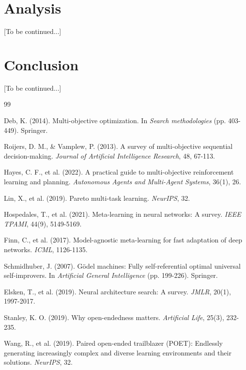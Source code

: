 \documentclass{article}
\begin{document}
\section{Analysis}
\label{sec:analysis}

[To be continued...]

\section{Conclusion}
\label{sec:conclusion}

[To be continued...]


\begin{thebibliography}{99}

Deb, K. (2014). Multi-objective optimization. In \textit{Search methodologies} (pp. 403-449). Springer.

Roijers, D. M., \& Vamplew, P. (2013). A survey of multi-objective sequential decision-making. \textit{Journal of Artificial Intelligence Research}, 48, 67-113.

Hayes, C. F., et al. (2022). A practical guide to multi-objective reinforcement learning and planning. \textit{Autonomous Agents and Multi-Agent Systems}, 36(1), 26.

Lin, X., et al. (2019). Pareto multi-task learning. \textit{NeurIPS}, 32.

Hospedales, T., et al. (2021). Meta-learning in neural networks: A survey. \textit{IEEE TPAMI}, 44(9), 5149-5169.

Finn, C., et al. (2017). Model-agnostic meta-learning for fast adaptation of deep networks. \textit{ICML}, 1126-1135.

Schmidhuber, J. (2007). G\"{o}del machines: Fully self-referential optimal universal self-improvers. In \textit{Artificial General Intelligence} (pp. 199-226). Springer.

Elsken, T., et al. (2019). Neural architecture search: A survey. \textit{JMLR}, 20(1), 1997-2017.

Stanley, K. O. (2019). Why open-endedness matters. \textit{Artificial Life}, 25(3), 232-235.

Wang, R., et al. (2019). Paired open-ended trailblazer (POET): Endlessly generating increasingly complex and diverse learning environments and their solutions. \textit{NeurIPS}, 32.


\end{thebibliography}
\end{document}
